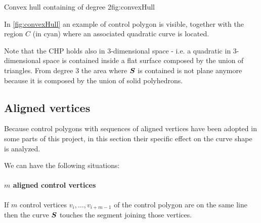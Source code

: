 \documentclass[dissertation.tex]{subfiles}
\begin{document}
\begin{myfig}{Convex hull containing \bs of degree 2}{fig:convexHull}
\end{myfig}
In \cref{fig:convexHull} an example of control polygon is visible,
together with the region $C$ (in cyan) where an associated quadratic
\bs curve is located.

Note that the \ac{CHP} holds also in
3-dimensional
space - i.e. a quadratic \bs in 3-dimensional space is contained
inside a flat surface composed by the union of triangles. From degree 3
the area where $\boldsymbol{S}$ is contained is not plane anymore
because it is composed by the union of solid polyhedrons.

\subsection{Aligned vertices}\label{sec:alignedVertices}
Because control polygons with sequences of
aligned vertices have been adopted in some parts of this project, in
this section their specific 
effect on the curve shape is analyzed. 

We can have the following situations:
\paragraph{$m$ aligned control vertices}
If $m$ control vertices $v_i,\dots,v_{i+m-1}$ of the control polygon
are on the same line then
the curve $\boldsymbol{S}$ touches the segment joining those vertices.
\end{document}
